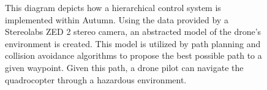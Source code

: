 \begin{figure}
	\centering
	
	\caption{
		This diagram depicts how a hierarchical control system is implemented within Autumn. Using the data provided by a Stereolabs ZED 2 stereo camera, an abstracted model of the drone's environment is created. This model is utilized by path planning and collision avoidance algorithms to propose the best possible path to a given waypoint. Given this path, a drone pilot can navigate the quadrocopter through a hazardous environment. 
	}
	\label{fig:autumnControlLoop}
\end{figure}


\filbreak